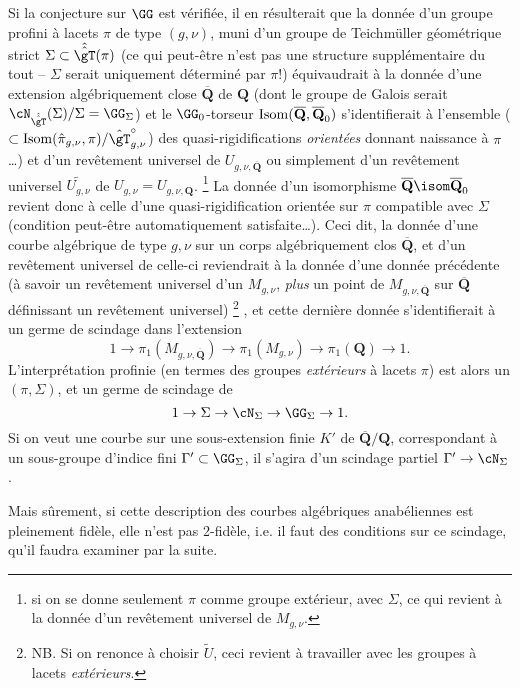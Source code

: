 Si la conjecture sur $\GG$ est vérifiée, il en
résulterait que la donnée d'un groupe profini à lacets
$\pi$ de type $(g,\nu)$, muni d'un groupe de Teichmüller
géométrique strict $\Sigma\subset \hat{\hat\gT}(\pi)$
(ce qui peut-être n'est pas une structure supplémentaire
du tout -- $\Sigma$ serait uniquement déterminé
par $\pi$!) équivaudrait à la donnée
d'une extension algébriquement close $\overline{\mathbf{Q}}$
de $\mathbf{Q}$ (dont le groupe de Galois serait $\cN_{{\hat{\hat\gT}}}
(\Sigma)/\Sigma=\GG_\Sigma$) et le $\GG_0$-torseur ${\rm Isom}
(\overline{\mathbf{Q}},\overline{\mathbf{Q}}_0)$ s'identifierait à 
l'ensemble ($\subset {\rm Isom}(\hat\pi_{g,\nu},\pi)/\hat\gT^\circ_{g,\nu}$)
des quasi-rigidifications {\it orientées} donnant naissance à
$\pi$\dots) et d'un revêtement universel de $U_{g,\nu,\overline{\mathbf{Q}}}$
ou simplement d'un revêtement universel $\widetilde{U_{g,\nu}}$
de $U_{g,\nu}=U_{g,\nu,\mathbf{Q}}$.
\footnote{si on se donne seulement $\pi$ comme groupe extérieur,
avec $\Sigma$, ce qui revient à la donnée d'un revêtement
universel de $M_{g,\nu}$.}
La donnée d'un isomorphisme
$\overline{\mathbf{Q}} \isom \overline{\mathbf{Q}}_0$ revient donc à celle
d'une quasi-rigidification orientée sur $\pi$ compatible
avec $\Sigma$ (condition peut-être automatiquement
satisfaite\dots).  Ceci dit, la donnée d'une courbe
algébrique de type $g,\nu$ sur un corps algébriquement
clos $\overline{\mathbf{Q}}$, et d'un revêtement universel de celle-ci
reviendrait à la donnée d'une donnée précédente
(à savoir un revêtement universel d'un $M_{g,\nu}$,
{\it plus} un point de $M_{g,\nu,\overline{\mathbf{Q}}}$ sur $\overline{\mathbf{Q}}$
définissant un revêtement universel)
\footnote{NB. Si on renonce à choisir $\widetilde{U}$, ceci
revient à travailler avec les groupes à lacets {\it extérieurs}.}
, et cette dernière
donnée s'identifierait à un germe de scindage dans l'extension
$$1\to\pi_1(M_{g,\nu,\overline{\mathbf{Q}}})\to
\pi_1(M_{g,\nu})\to\pi_1(\mathbf{Q})\to 1.$$
L'interprétation profinie (en termes des groupes {\it extérieurs}
à lacets $\pi$) est alors un
$(\pi,\Sigma)$, et un germe de scindage de 
$$1\to\Sigma\to\cN_\Sigma\to
\GG_\Sigma\to 1.$$
Si on veut une courbe sur une sous-extension finie $K'$
de $\overline{\mathbf{Q}}/\mathbf{Q}$, correspondant à un sous-groupe
d'indice fini $\Gamma'\subset \GG_\Sigma$, il s'agira 
d'un scindage partiel $\Gamma'\to\cN_\Sigma$.

Mais s\^urement, si cette description des courbes
algébriques anabéliennes est pleinement fidèle, elle
n'est pas 2-fidèle, i.e. il faut des
conditions sur ce scindage, qu'il faudra examiner
par la suite. 

